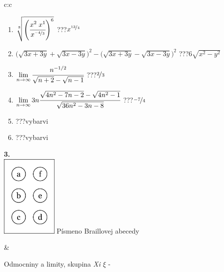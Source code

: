 \documentclass[10pt]{report}
\begin{document}
\begin{tabular}{c:c}
\begin{minipage}[c][104.5mm][t]{0.5\linewidth}
\begin{center}
\begin{minipage}{0.79\linewidth}
\begin{center}
\begin{varwidth}{\linewidth}
\begin{enumerate}
\small
\item $\sqrt[8]{\left(\cfrac{x^{2}\;x^{1}}{x^{\nicefrac{-4}{3}}}\right)^{6}}$\quad \dotfill\; ???\;\dotfill \quad $x^{\nicefrac{13}{4}}$
\item {\footnotesize{\scriptsize$\big(\sqrt{3x+3y}+\sqrt{3x-3y}\big)^2-\big(\sqrt{3x+3y}-\sqrt{3x-3y}\big)^2$}\quad \dotfill\; ???\;\dotfill \quad $6\sqrt{x^2-y^2}$}
\item $\lim\limits_{n\to\infty}\cfrac{n^{-1/2}}{\sqrt{n+2}-\sqrt{n-1}}$\quad \dotfill\; ???\;\dotfill \quad $\nicefrac{2}{3}$
\item $\lim\limits_{n\to\infty}3n\cfrac{\sqrt{4n^2-7n-2}-\sqrt{4n^2-1}}{\sqrt{36n^2-3n-8}}$\quad \dotfill\; ???\;\dotfill \quad $\nicefrac{-7}{4}$
\item \quad \dotfill\; ???\;\dotfill \quad vybarvi
\item \quad \dotfill\; ???\;\dotfill \quad vybarvi
\end{enumerate}
\end{varwidth}
\end{center}
\end{minipage}
\begin{minipage}{0.20\linewidth}
\begin{center}
{\Huge\bfseries 3.} \\[2mm]
\includegraphics[height=40mm]{../images/braille.png}
{\small Písmeno Braillovej abecedy}
\end{center}
\end{minipage}
\end{center}
\end{minipage}
&
\begin{minipage}[c][104.5mm][t]{0.5\linewidth}
\begin{center}
\vspace{7mm}
{\huge Odmocniny a limity, skupina \textit{Xi $\xi$} -}\\[5mm]

\end{center}
\end{minipage}
\end{tabular}
\end{document}
